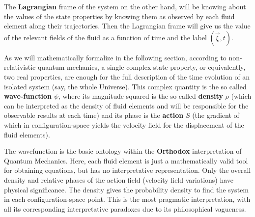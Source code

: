 \documentclass[11pt, a4paper]{article} %
\begin{document}
The {\bf Lagrangian} frame of the system on the other hand, will be knowing about the values of the state properties by knowing them as observed by each fluid element along their trajectories.  Then the Lagrangian frame will give us the value of the relevant fields of the fluid as a function of time and the label $(\vec{\xi},t)$.
 
As we will mathematically formalize in the following section, according to non-relativistic quantum mechanics, a single complex state property, or equivalently, two real properties, are enough for the full description of the time evolution of an isolated system (say, the whole Universe). This complex quantity is the so called {\bf wave-function} $\psi$, where its magnitude squared is the so called {\bf density} $\rho$ (which can be interpreted as the density of fluid elements and will be responsible for the observable results at each time) and its phase is the {\bf action} $S$ (the gradient of which in configuration-space yields the velocity field for the displacement of the fluid elements).

The wavefunction is the basic ontology within the {\bf Orthodox} interpretation of Quantum Mechanics. Here, each fluid element is just a mathematically valid tool for obtaining equations, but has no interpretative representation. Only the overall density and relative phases of the action field (velocity field variations) have physical significance. The density gives the probability density to find the system in each configuration-space point. This is the most pragmatic interpretation, with all its corresponding interpretative paradoxes due to its philosophical vagueness. 
\end{document}
